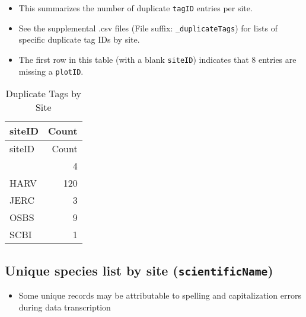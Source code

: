 \documentclass[]{article}
\begin{document}
\begin{itemize}
\itemsep1pt\parskip0pt
\item
  This summarizes the number of duplicate \texttt{tagID} entries per
  site.
\item
  See the supplemental .csv files (File suffix:
  \texttt{\_duplicateTags}) for lists of specific duplicate tag IDs by
  site.
\item
  The first row in this table (with a blank \texttt{siteID}) indicates
  that 8 entries are missing a \texttt{plotID}.
\end{itemize}

\begin{longtable}[c]{@{}lr@{}}
\caption{Duplicate Tags by Site}\tabularnewline
\toprule
siteID & Count\tabularnewline
\midrule
\endfirsthead
\toprule
siteID & Count\tabularnewline
\midrule
\endhead
& 4\tabularnewline
HARV & 120\tabularnewline
JERC & 3\tabularnewline
OSBS & 9\tabularnewline
SCBI & 1\tabularnewline
\bottomrule
\end{longtable}

\subsection{Unique species list by site
(\texttt{scientificName})}\label{unique-species-list-by-site-scientificname}

\begin{itemize}
\itemsep1pt\parskip0pt
\item
  Some unique records may be attributable to spelling and capitalization
  errors during data transcription
\end{itemize}
\end{document}
